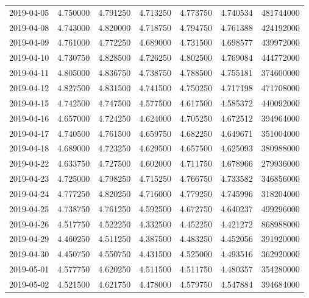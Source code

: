\begin{tabular}{lrrrrrr}
2019-04-05 &    4.750000 &    4.791250 &    4.713250 &    4.773750 &    4.740534 &   481744000 \\
2019-04-08 &    4.743000 &    4.820000 &    4.718750 &    4.794750 &    4.761388 &   424192000 \\
2019-04-09 &    4.761000 &    4.772250 &    4.689000 &    4.731500 &    4.698577 &   439972000 \\
2019-04-10 &    4.730750 &    4.828500 &    4.726250 &    4.802500 &    4.769084 &   444772000 \\
2019-04-11 &    4.805000 &    4.836750 &    4.738750 &    4.788500 &    4.755181 &   374600000 \\
2019-04-12 &    4.827500 &    4.831500 &    4.741500 &    4.750250 &    4.717198 &   471708000 \\
2019-04-15 &    4.742500 &    4.747500 &    4.577500 &    4.617500 &    4.585372 &   440092000 \\
2019-04-16 &    4.657000 &    4.724250 &    4.624000 &    4.705250 &    4.672512 &   394964000 \\
2019-04-17 &    4.740500 &    4.761500 &    4.659750 &    4.682250 &    4.649671 &   351004000 \\
2019-04-18 &    4.689000 &    4.723250 &    4.629500 &    4.657500 &    4.625093 &   380988000 \\
2019-04-22 &    4.633750 &    4.727500 &    4.602000 &    4.711750 &    4.678966 &   279936000 \\
2019-04-23 &    4.725000 &    4.798250 &    4.715250 &    4.766750 &    4.733582 &   346856000 \\
2019-04-24 &    4.777250 &    4.820250 &    4.716000 &    4.779250 &    4.745996 &   318204000 \\
2019-04-25 &    4.738750 &    4.761250 &    4.592500 &    4.672750 &    4.640237 &   499296000 \\
2019-04-26 &    4.517750 &    4.522250 &    4.332500 &    4.452250 &    4.421272 &   868988000 \\
2019-04-29 &    4.460250 &    4.511250 &    4.387500 &    4.483250 &    4.452056 &   391920000 \\
2019-04-30 &    4.450750 &    4.550750 &    4.431500 &    4.525000 &    4.493516 &   362920000 \\
2019-05-01 &    4.577750 &    4.620250 &    4.511500 &    4.511750 &    4.480357 &   354280000 \\
2019-05-02 &    4.521500 &    4.621750 &    4.478000 &    4.579750 &    4.547884 &   394684000 \\

\end{tabular}
